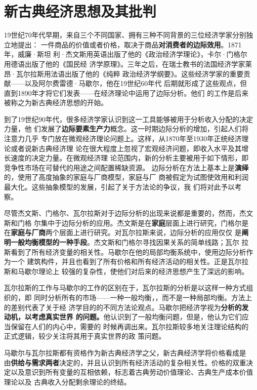 \part{新古典经济思想及其批判}

19世纪70年代早期，来自三个不同国家、拥有三种不同背景的三位经济学家分别独立地提出：
一件商品的价值或者价格，取决于商品\textbf{对消费者的边际效用}。1871年，威廉·斯坦
利·杰文斯用英语出版了他的《政治经济学理论》，卡尔·门格尔用德语出版了他的《国民经
济学原理》。三年之后，在瑞士教书的法国经济学家莱昂·瓦尔拉斯用法语出版了他的《纯粹
政治经济学纲要》。这些经济学家的重要贡献——以及阿尔费雷德·马歇尔，他在19世纪60年代
后期就形成了这些观点，但直到1890年才将它们发表——在经济理论中运用了边际分析。他们
的工作是后来被称之为新古典经济思想的开始。

到了19世纪90年代，很多经济学家认识到这一工具能够被用于分析收入分配的决定力量，他
们发展了\textbf{边际要素生产力}概念。这一时期边际分析的增加，引起人们将注意力几乎
专门放在微观经济理论问题上。这样，从1870年至1930年正统经济理论或者说新古典经济理
论在很大程度上忽视了宏观经济问题，即收入水平及其增长速度的决定力量。在微观经济理
论范围内，新的分析主要被用于如下情形，即竞争性市场在可替代的用途之间配置稀缺资源。
边际分析在方法上基本上是\textbf{演绎}的，使用了高度抽象的家庭与厂商模型，家庭与厂
商被假定为试图使效用和利润最大化。这些抽象模型的发展，引起了关于方法论的争议，我
们将对此予以考察。

尽管杰文斯、门格尔、瓦尔拉斯对于边际分析的出现来说都是重要的，然而，杰文斯和门格
尔集中于边际分析的应用。杰文斯是在\textbf{家庭}层面上进行研究，门格尔是
在\textbf{家庭与厂商}两个层面上进行研究。对瓦尔拉斯来说，边际分析的应用仅仅
是\textbf{阐明一般均衡模型的一种手段}。杰文斯和门格尔寻找因果关系的简单线路；瓦尔
拉斯看到了所有经济变量的相关性。马歇尔在他的局部均衡系统中，使用边际分析作为一个
建筑构件，并且也看到了所有价格和所有经济活动的相关性。正是瓦尔拉斯和马歇尔理论上
较强的复杂性，使他们对后来的经济思想产生了深远的影响。

瓦尔拉斯的工作与马歇尔的工作的区别在于，瓦尔拉斯的分析是以这样一种方式组织的，即
同时分析所有的市场——一种一般均衡，，而不是一种局部均衡。方法上的差别代表了关于经
济学目的的不同方法论观点。马歇尔把经济学视为\textbf{分析的发动机，以考虑真实世界
  的问题。}他认识到了一般均衡问题，但是，他认为它们应当保留在人们的内心中，需要的
时候再调出来。瓦尔拉斯较多地关注理论结构的正式逻辑，较少关注将其用于真实世界的政
策问题。

马歇尔与瓦尔拉斯都有资格作为新古典经济学之父，新古典经济学将价格看成是
由\textbf{供给与需求两者}决定的，并且认识到所有经济活动的复杂相关性。价格的双重决
定以及意识到所有变量的互相依赖，标志着古典劳动价值理论、古典生产成本价值理论以及
古典收入分配剩余理论的终结。

